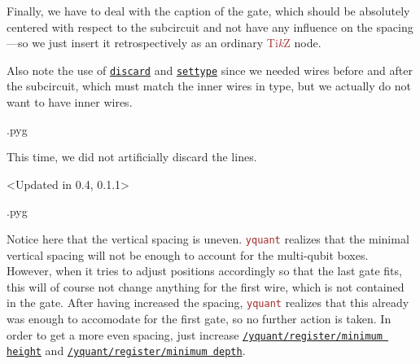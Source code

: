 \documentclass{scrartcl}
\makeatletter
\newenvironment{codeexample}{%
   \VerbatimEnvironment%
   \let\FVB@VerbatimOut\minted@FVB@VerbatimOut
   \let\FVE@VerbatimOut\minted@FVE@VerbatimOut
   \minted@configlang{tex}%
   \minted@fvset
   \begin{VerbatimOut}[codes={\catcode`\^^I=12},firstline,lastline]{\minted@jobname.pyg}%
}{
   \end{VerbatimOut}%
   \minted@langlinenoson%
   \savebox\codeexamplebox{ \minted@jobname.pyg}%
   \ifdim\wd\codeexamplebox>\dimexpr.5\linewidth-3mm\relax%
      \wd\codeexamplebox=.5\linewidth%
   \else%
      \wd\codeexamplebox=\dimexpr\wd\codeexamplebox+3mm\relax%
   \fi%
   \noindent\begin{minipage}{\wd\codeexamplebox}%
      \centering%
      \usebox\codeexamplebox%
   \end{minipage}%
   \begin{minipage}{\dimexpr\linewidth-\wd\codeexamplebox\relax}%
      \minted@pygmentize{\minted@lang}%
   \end{minipage}%
   \minted@langlinenosoff%
   \par%
}
\def\TikZ{\textcolor{brown}{Ti\textit kZ}}
\def\pkg#1{\textcolor{brown}{\texttt{#1}}}
\def\gate#1{\hyperref[gate:#1]{\texttt{#1}}}
\def\style#1{\hyperref[style:#1]{\texttt{#1}}}
\def\Yquant{\pkg{yquant}}
\makeatother
\begin{document}
\begin{example}
               Finally, we have to deal with the caption of the gate, which should be absolutely centered with respect to the subcircuit and not have any influence on the spacing---so we just insert it retrospectively as an ordinary \TikZ{} node.

               Also note the use of \gate{discard} and \gate{settype} since we needed wires before and after the subcircuit, which must match the inner wires in type, but we actually do not want to have inner wires.
            \end{example}

            \begin{example}
               \begin{codeexample}
               \end{codeexample}
               This time, we did not artificially discard the lines.
            \end{example}

            \begin{example}<Updated in 0.4, 0.1.1>
               \begin{codeexample}
               \end{codeexample}
               Notice here that the vertical spacing is uneven.
               \Yquant{} realizes that the minimal vertical spacing will not be enough to account for the multi\hyp qubit boxes.
               However, when it tries to adjust positions accordingly so that the last gate fits, this will of course not change anything for the first wire, which is not contained in the gate.
               After having increased the spacing, \Yquant{} realizes that this already was enough to accomodate for the first gate, so no further action is taken.
               In order to get a more even spacing, just increase \style{/yquant/register/minimum height} and \style{/yquant/register/minimum depth}.
            \end{example}
\end{document}
